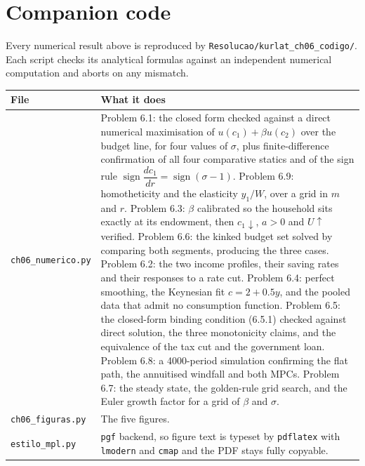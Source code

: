\documentclass[12pt, letterpaper]{article}
\newcommand{\dd}[2]{\dfrac{d #1}{d #2}}
\begin{document}
\section*{Companion code}

Every numerical result above is reproduced by \texttt{Resolucao/kurlat\_ch06\_codigo/}. Each
script checks its analytical formulas against an independent numerical computation and aborts
on any mismatch.

\begin{center}
\begin{tabular}{@{}lp{10.2cm}@{}}
\toprule
\textbf{File} & \textbf{What it does} \\
\midrule
\texttt{ch06\_numerico.py} & Problem 6.1: the closed form checked against a direct numerical
maximisation of $u(c_1)+\beta u(c_2)$ over the budget line, for four values of $\sigma$, plus
finite-difference confirmation of all four comparative statics and of the sign rule
$\operatorname{sign}\dd{c_1}{r}=\operatorname{sign}(\sigma-1)$. Problem 6.9: homotheticity
and the elasticity $y_1/W$, over a grid in $m$ and $r$. Problem 6.3: $\beta$ calibrated so
the household sits exactly at its endowment, then $c_1\downarrow$, $a>0$ and $U\uparrow$
verified. Problem 6.6: the kinked budget set solved by comparing both segments, producing the
three cases. Problem 6.2: the two income profiles, their saving rates and their responses to
a rate cut. Problem 6.4: perfect smoothing, the Keynesian fit $c=2+0.5y$, and the pooled data
that admit no consumption function. Problem 6.5: the closed-form binding condition (6.5.1)
checked against direct solution, the three monotonicity claims, and the equivalence of the
tax cut and the government loan. Problem 6.8: a 4000-period simulation confirming the flat
path, the annuitised windfall and both MPCs. Problem 6.7: the steady state, the golden-rule
grid search, and the Euler growth factor for a grid of $\beta$ and $\sigma$. \\
\texttt{ch06\_figuras.py} & The five figures. \\
\texttt{estilo\_mpl.py} & \texttt{pgf} backend, so figure text is typeset by \texttt{pdflatex}
with \texttt{lmodern} and \texttt{cmap} and the PDF stays fully copyable. \\
\bottomrule
\end{tabular}
\end{center}
\end{document}
